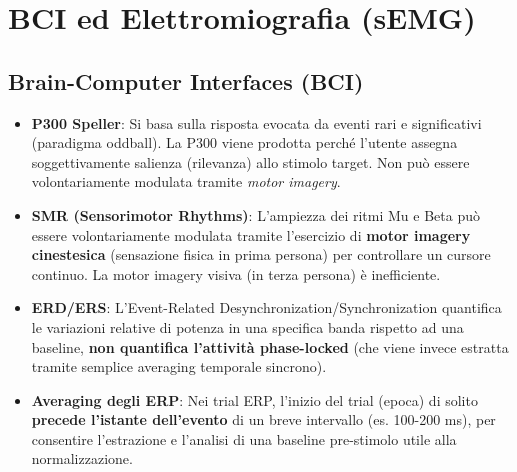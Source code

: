 \documentclass[10pt, letterpaper]{report}
\begin{document}
\chapter{BCI ed Elettromiografia (sEMG)}

\section{Brain-Computer Interfaces (BCI)}
\begin{itemize}
    \item \textbf{P300 Speller}: Si basa sulla risposta evocata da eventi rari e significativi (paradigma oddball). La P300 viene prodotta perché l'utente assegna soggettivamente salienza (rilevanza) allo stimolo target. Non può essere volontariamente modulata tramite \emph{motor imagery}.
    \item \textbf{SMR (Sensorimotor Rhythms)}: L'ampiezza dei ritmi Mu e Beta può essere volontariamente modulata tramite l'esercizio di \textbf{motor imagery cinestesica} (sensazione fisica in prima persona) per controllare un cursore continuo. La motor imagery visiva (in terza persona) è inefficiente.
    \item \textbf{ERD/ERS}: L'Event-Related Desynchronization/Synchronization quantifica le variazioni relative di potenza in una specifica banda rispetto ad una baseline, \textbf{non quantifica l'attività phase-locked} (che viene invece estratta tramite semplice averaging temporale sincrono).
    \item \textbf{Averaging degli ERP}: Nei trial ERP, l'inizio del trial (epoca) di solito \textbf{precede l'istante dell'evento} di un breve intervallo (es. 100-200 ms), per consentire l'estrazione e l'analisi di una baseline pre-stimolo utile alla normalizzazione.
\end{itemize}
\end{document}
